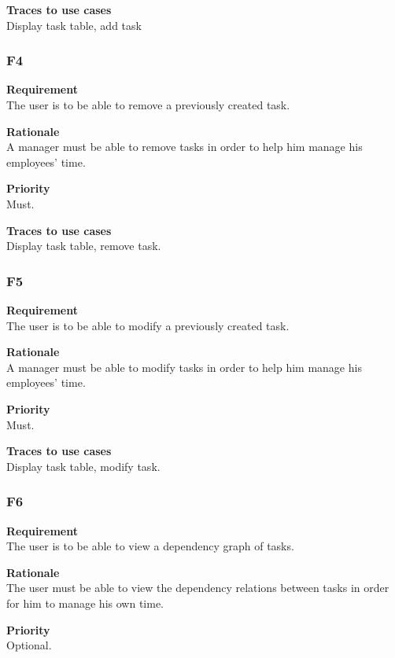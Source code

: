 \documentclass[12pt]{article}
\begin{document}
\noindent
{\bf Traces to use cases}\\
Display task table, add task

\subsubsection{F4} \label{uc:4}

\noindent
{\bf Requirement}\\
The user is to be able to remove a previously created task.

\noindent
{\bf Rationale}\\
A manager must be able to remove tasks in order to help him manage his employees' time.

\noindent
{\bf Priority}\\
Must.

\noindent
{\bf Traces to use cases}\\
Display task table, remove task.

\subsubsection{F5} \label{uc:5}

\noindent
{\bf Requirement}\\
The user is to be able to modify a previously created task.

\noindent
{\bf Rationale}\\
A manager must be able to modify tasks in order to help him manage his employees' time.

\noindent
{\bf Priority}\\
Must.

\noindent
{\bf Traces to use cases}\\
Display task table, modify task.

\subsubsection{F6} \label{uc:6}

\noindent
{\bf Requirement}\\
The user is to be able to view a dependency graph of tasks.

\noindent
{\bf Rationale}\\
The user must be able to view the dependency relations between tasks in order for him to manage his own time.

\noindent
{\bf Priority}\\
Optional.
\end{document}
